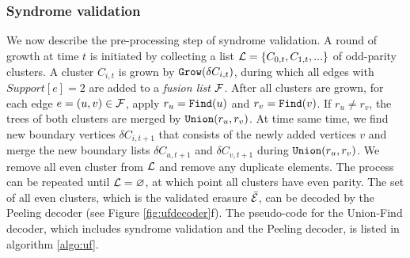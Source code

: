 \subsubsection{Syndrome validation}
We now describe the pre-processing step of syndrome validation. A round of growth at time $t$ is initiated by collecting a list $\mathcal{L} = \{C_{0,t}, C_{1,t}, ...\}$ of odd-parity clusters. A cluster $C_{i,t}$ is grown by $\texttt{Grow}(\delta C_{i,t})$, during which all edges with $Support[e]=2$ are added to a \emph{fusion list} $\mathcal{F}$. After all clusters are grown, for each edge $e=(u,v) \in \mathcal{F}$, apply $r_u=\texttt{Find}(u)$ and $r_v=\texttt{Find}(v)$. If $r_u\neq r_v$, the trees of both clusters are merged by $\texttt{Union}(r_u,r_v)$. At time same time, we find new boundary vertices $\delta C_{i,t+1}$ that consists of the newly added vertices $v$ and merge the new boundary lists $\delta C_{u,t+1}$ and $\delta C_{v,t+1}$ during $\texttt{Union}(r_u,r_v)$. We remove all even cluster from $\mathcal{L}$ and remove any duplicate elements. The process can be repeated until $\mathcal{L}=\varnothing$, at which point all clusters have even parity. The set of all even clusters, which is the validated erasure $\bar{\mathcal{E}}$, can be decoded by the Peeling decoder (see Figure \ref{fig:ufdecoder}f). The pseudo-code for the Union-Find decoder, which includes syndrome validation and the Peeling decoder, is listed in algorithm \ref{algo:uf}. 




